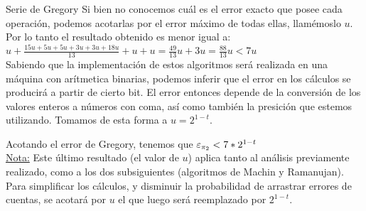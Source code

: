 \begin{subsubsection}{Serie de Gregory}
	Si bien no conocemos cuál es el error exacto que posee cada operación, podemos acotarlas por el error máximo de todas ellas, llamémoslo $u$. Por lo tanto el resultado obtenido es menor igual a:\\

	$u + \frac{15u + 5u + 5u + 3u + 3u + 18u}{13} + u + u = \frac{49}{13}u + 3u = \frac{88}{13}u < 7u$\\

	Sabiendo que la implementación de estos algoritmos será realizada en una máquina con arítmetica binarias, podemos inferir que el error en los cálculos se producirá a partir de cierto bit. El error entonces depende de la conversión de los valores enteros a números con coma, así como también la presición que estemos utilizando. Tomamos de esta forma a $u=2^{1-t}$.
	
	Acotando el error de Gregory, tenemos que $\varepsilon _{\pi_2} < 7*2^{1-t}$\\
	
	\underline{Nota:} Este último resultado (el valor de $u$) aplica tanto al análisis previamente realizado, como a los dos subsiguientes (algoritmos de Machin y Ramanujan). Para simplificar los cálculos, y disminuir la probabilidad de arrastrar errores de cuentas, se acotará por $u$ el que luego será reemplazado por $2^{1-t}$.
\end{subsubsection}